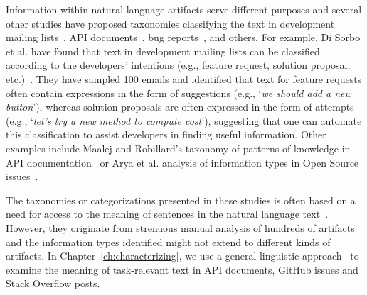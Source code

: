Information within natural language artifacts 
serve different purposes and several other studies have
 proposed taxonomies classifying the text in 
 development mailing lists~\cite{Sorbo2015, huang2018automating},
API documents~\cite{Maalej2013}, bug reports~\cite{Arya2019}, and others.
For example, Di Sorbo et al. have found that 
text in development mailing lists can be classified according to the developers' intentions (e.g., feature request, solution proposal, etc.)~\cite{Sorbo2015}.
They have sampled 100 emails and identified that text for feature requests 
often contain expressions in the form of suggestions
(e.g., `\textit{we should add a new button}'), whereas solution proposals 
are often expressed in the form of attempts (e.g., `\textit{let's try a new method to compute cost}'),
suggesting that one can automate this classification to assist developers in finding useful information.
Other examples include Maalej and Robillard's taxonomy of patterns of knowledge in API documentation~\cite{Maalej2013}
or Arya et al. analysis of information types in Open Source issues~\cite{Arya2019}.



The taxonomies or categorizations presented in these studies is often based
on a need for access to the meaning of
sentences in the natural language text~\cite{berners2001, calero2006, witte2007}.
However, they originate from strenuous manual analysis 
of hundreds of artifacts and the information types identified 
might not extend to different kinds of artifacts.
In Chapter~\ref{ch:characterizing}, 
we use a general linguistic approach~\cite{fillmore1976frame} to
examine the meaning of task-relevant text in 
API documents, GitHub issues and Stack Overflow posts.

















